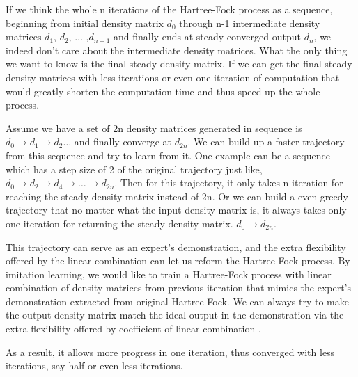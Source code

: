 \documentclass[twoside]{article}
\begin{document}
If we think the whole n iterations of the Hartree-Fock process as a sequence, beginning from initial density matrix $d_0$ through n-1 intermediate density matrices $d_1$,  $d_2$,  $\ldots$ ,$d_{n-1}$ and finally ends at steady converged output $d_{n}$, we indeed don't care about the intermediate density matrices. What the only thing we want to know is the final steady density matrix. If we can get the final steady density matrices with less iterations or even one iteration of computation that would greatly shorten the computation time and thus speed up the whole process. 



Assume we have a set of 2n density matrices generated in sequence is  $d_0 \rightarrow  d_1 \rightarrow  d_2  \ldots  $ and finally converge at $d_{2n}$. 
We can build up a faster trajectory from this sequence and try to learn from it.
One example can be a sequence which has a step size of 2 of the original trajectory just like,$d_0 \rightarrow d_2 \rightarrow  d_4 \rightarrow  \ldots \rightarrow  d_{2n}$. Then for this trajectory, it only takes n iteration for reaching the steady density matrix instead of 2n.
Or we can build a even greedy trajectory that no matter what the input density matrix is, it always takes only one iteration for returning the steady density matrix. $d_0 \rightarrow d_{2n}$.


This trajectory can serve as an expert's demonstration, and the extra flexibility offered by the linear combination can let us reform the Hartree-Fock process. By imitation learning, we would like to train a Hartree-Fock process with linear combination of density matrices from previous iteration that mimics the expert's demonstration extracted from original Hartree-Fock. We can always try to make the output density matrix match the ideal output in the demonstration via the extra flexibility offered by coefficient of linear combination .


As a result, it allows more progress in one iteration, thus converged with less iterations, say half or even less iterations.  
\end{document}
